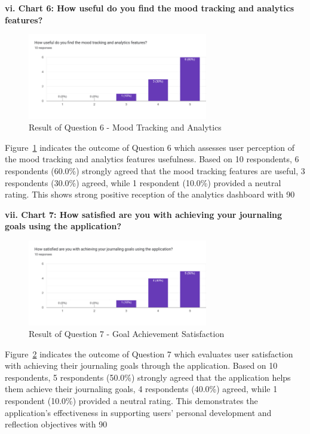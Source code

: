 \textbf{vi. Chart 6: How useful do you find the mood tracking and analytics features?}

\begin{figure}[H]
\centering
\includegraphics[width=0.7\textwidth]{files/imgs/survey/chart6_mood_analytics.png}
\caption{Result of Question 6 - Mood Tracking and Analytics}
\label{fig:chart6-mood}
\end{figure}

Figure~\ref{fig:chart6-mood} indicates the outcome of Question 6 which assesses user perception of the mood tracking and analytics features usefulness. Based on 10 respondents, 6 respondents (60.0\%) strongly agreed that the mood tracking features are useful, 3 respondents (30.0\%) agreed, while 1 respondent (10.0\%) provided a neutral rating. This shows strong positive reception of the analytics dashboard with 90%

\textbf{vii. Chart 7: How satisfied are you with achieving your journaling goals using the application?}

\begin{figure}[H]
\centering
\includegraphics[width=0.7\textwidth]{files/imgs/survey/chart7_goal_achievement.png}
\caption{Result of Question 7 - Goal Achievement Satisfaction}
\label{fig:chart7-goals}
\end{figure}

Figure~\ref{fig:chart7-goals} indicates the outcome of Question 7 which evaluates user satisfaction with achieving their journaling goals through the application. Based on 10 respondents, 5 respondents (50.0\%) strongly agreed that the application helps them achieve their journaling goals, 4 respondents (40.0\%) agreed, while 1 respondent (10.0\%) provided a neutral rating. This demonstrates the application's effectiveness in supporting users' personal development and reflection objectives with 90%

